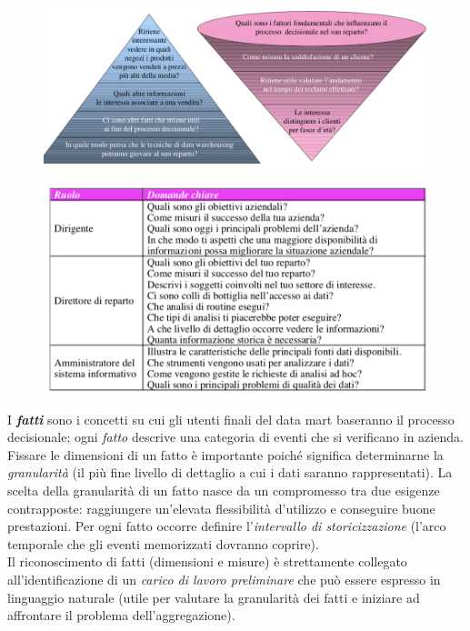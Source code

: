 \documentclass[a4paper, notitlepage, 9pt]{extreport}
\begin{document}
\begin{multicols}{2}
	\begin{figure}[H]
		\centering
		\includegraphics[scale=0.42]{Piramide}
	\end{figure}
\columnbreak
	\begin{figure}[H]
		\centering
		\includegraphics[scale=0.42]{Domande}
	\end{figure}
\end{multicols}
\noindent
I \textit{\textbf{fatti}} sono i concetti su cui gli utenti finali del data mart baseranno il processo decisionale; ogni \textit{fatto} descrive una categoria di eventi che si verificano in azienda. Fissare le dimensioni di un fatto è importante poiché significa determinarne la \textit{granularità} (il più fine livello di dettaglio a cui i dati saranno rappresentati). La scelta della granularità di un fatto nasce da un compromesso tra due esigenze contrapposte: raggiungere un'elevata flessibilità d'utilizzo e conseguire buone prestazioni. Per ogni fatto occorre definire l’\textit{intervallo di storicizzazione} (l’arco temporale che gli eventi memorizzati dovranno coprire).\\
Il riconoscimento di fatti (dimensioni e misure) è strettamente collegato all’identificazione di un \textit{carico di lavoro preliminare} che può essere espresso in linguaggio naturale (utile per valutare la granularità dei fatti e iniziare ad affrontare il problema dell’aggregazione).
\end{document}
